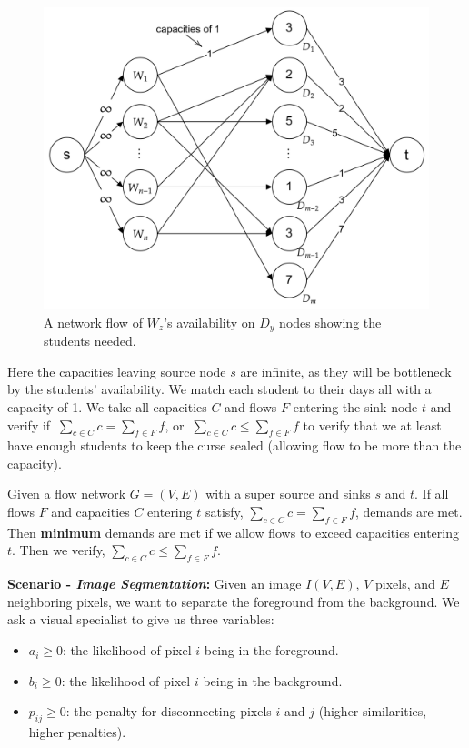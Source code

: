 \begin{figure}[h]
    \centering
    \includegraphics[width=.7\textwidth]{Sections/net/wizards.png}
    \caption{A network flow of $W_z$'s availability on $D_y$ nodes showing the students needed.}
\end{figure}

\noindent
Here the capacities leaving source node $s$ are infinite, as they will be bottleneck by the students' availability. 
We match each student to their days all with a capacity of 1. We take all capacities $C$ and flows $F$ entering the sink node $t$
and verify if $\ \displaystyle{\sum_{c\in C} c = \sum_{f\in F} f}$, or $\ \displaystyle{\sum_{c\in C} c \leq \sum_{f\in F} f}$ 
to verify that we at least have enough students to keep the curse sealed (allowing flow to be more than the capacity).
\begin{theo}

    Given a flow network $G=(V,E)$ with a super source and sinks $s$ and $t$. If all flows $F$ and capacities $C$ entering $t$ satisfy,
    $\displaystyle{\sum_{c\in C} c = \sum_{f\in F} f}$, demands are met. Then \textbf{minimum} demands are met if we allow flows to exceed
    capacities entering $t$. Then we verify, $\displaystyle{\sum_{c\in C} c \leq \sum_{f\in F} f}$.
\end{theo}


\newpage 

\newpage
\noindent
\textbf{Scenario - \textit{Image Segmentation}:} Given an image $I(V,E)$, $V$ pixels, and $E$ neighboring pixels, we want to
separate the foreground from the background. We ask a visual specialist to give us three variables: 

\begin{itemize}
    \item $a_i\geq 0$: the likelihood of pixel $i$ being in the foreground.
    \item $b_i \geq 0$: the likelihood of pixel $i$ being in the background.
    \item $p_{ij} \geq 0$: the penalty for disconnecting pixels $i$ and $j$ (higher similarities, higher penalties).
\end{itemize}

